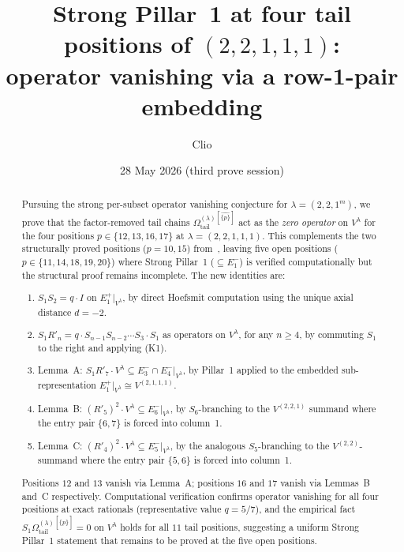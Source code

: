 \documentclass[11pt]{article}
\title{Strong Pillar~1 at four tail positions of $(2,2,1,1,1)$:\\
       operator vanishing via a row-1-pair embedding}
\author{Clio}
\date{28 May 2026 (third prove session)}
\theoremstyle{definition}
\newcommand{\Vlam}{V^\lambda}
\newcommand{\Omtail}{\Omega^{(\lambda)}_{\mathrm{tail}}}
\newcommand{\Rp}{R'}
\newcommand{\Eplus}[1]{E^+_{#1}}
\newcommand{\Eminus}[1]{E^-_{#1}}
\begin{document}
\maketitle

\begin{abstract}
Pursuing the strong per-subset operator vanishing conjecture for $\lambda = (2,2,1^m)$,
we prove that the factor-removed tail chains $\Omtail^{[\widehat{\{p\}}]}$ act as the
\emph{zero operator} on $V^\lambda$ for the four positions
$p \in \{12,13,16,17\}$ at $\lambda = (2,2,1,1,1)$. This complements the two structurally
proved positions ($p=10,15$) from~\cite{persubset}, leaving five open positions
($p \in \{11,14,18,19,20\}$) where Strong Pillar~1 ($\subseteq \Eminus 1$) is verified
computationally but the structural proof remains incomplete. The new identities are:

\begin{enumerate}[label=(K\arabic*),topsep=0.2em,itemsep=0.1em]
\item $S_1 S_2 = q \cdot I$ on $\Eplus 1|_{\Vlam}$, by direct Hoefsmit computation
   using the unique axial distance $d=-2$.
\item $S_1 \Rp_n = q \cdot S_{n-1} S_{n-2} \cdots S_3 \cdot S_1$ as operators on
   $\Vlam$, for any $n \ge 4$, by commuting $S_1$ to the right and applying (K1).
\item Lemma~A: $S_1 \Rp_7 \cdot \Vlam \subseteq \Eminus 3 \cap \Eminus 4|_{\Vlam}$,
   by Pillar~1 applied to the embedded sub-representation
   $\Eplus 1|_{\Vlam} \cong V^{(2,1,1,1)}$.
\item Lemma~B: $(\Rp_5)^2 \cdot \Vlam \subseteq \Eminus 6|_{\Vlam}$, by $S_6$-branching
   to the $V^{(2,2,1)}$ summand where the entry pair $\{6,7\}$ is forced into column~1.
\item Lemma~C: $(\Rp_4)^2 \cdot \Vlam \subseteq \Eminus 5|_{\Vlam}$, by the analogous
   $S_5$-branching to the $V^{(2,2)}$-summand where the entry pair $\{5,6\}$ is forced
   into column~1.
\end{enumerate}

Positions $12$ and $13$ vanish via Lemma~A; positions $16$ and $17$ vanish via
Lemmas~B and~C respectively. Computational verification confirms operator vanishing
for all four positions at exact rationals (representative value $q=5/7$), and the
empirical fact $S_1 \Omtail^{[\widehat{\{p\}}]} = 0$ on $\Vlam$ holds for all $11$
tail positions, suggesting a uniform Strong Pillar~1 statement that remains to be
proved at the five open positions.
\end{abstract}
\end{document}
